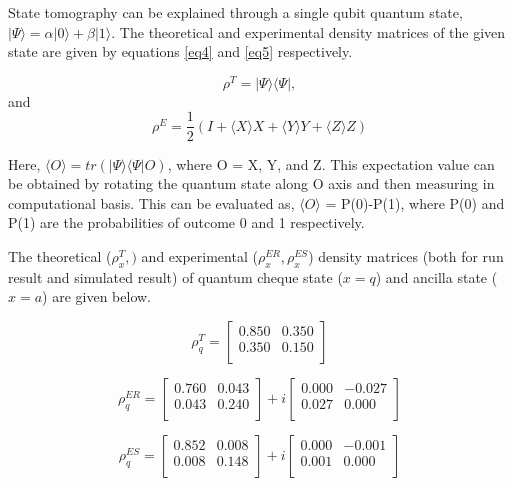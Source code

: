 \documentclass[aps,pra,twocolumn,groupedaddress,showpacs,showkeys]{revtex4-1}
\begin{document}
State tomography can be explained through a single qubit quantum state, $|\Psi\rangle = \alpha|0\rangle + \beta|1\rangle$. The theoretical and experimental density matrices of the given state are given by equations \ref{eq4} and \ref{eq5} respectively. 

\begin{equation}
\rho^{T}= |\Psi\rangle \langle\Psi|,     
\label{eq4}
\end{equation}
and 
\begin{equation}
\rho^{E}= \frac{1}{2} (I + \langle X\rangle X + \langle Y \rangle Y + \langle Z \rangle Z)
\label{eq5}
\end{equation}
 
Here, $\langle O \rangle = tr(|\Psi\rangle \langle \Psi|O)$, where O = X, Y, and Z. This expectation value can be obtained by rotating the quantum state along O axis and then measuring in computational basis. This can be evaluated as, $\langle O \rangle$ = P(0)-P(1), where P(0) and P(1) are the probabilities of outcome 0 and 1 respectively.  

The theoretical ($\rho^{T}_x,)$ and experimental ($\rho^{ER}_x, \rho^{ES}_x$) density matrices (both for run result and simulated result) of quantum cheque state ($x=q$) and ancilla state ($x=a$) are given below. 

\[
   \rho^{T}_{q}=
  \left[ {\begin{array}{cc}
   0.850 & 0.350 \\
   0.350 & 0.150 \\
  \end{array} } \right]
\]

\[
  \rho^{ER}_{q}=
  \left[ {\begin{array}{cc}
   0.760 & 0.043 \\
   0.043 & 0.240 \\
  \end{array} } \right]+ i\left[ {\begin{array}{cc}
   0.000 & -0.027 \\
   0.027 & 0.000 \\
  \end{array} } \right]
\]

\[
  \rho^{ES}_{q}=
  \left[ {\begin{array}{cc}
   0.852 & 0.008 \\
   0.008 & 0.148 \\
  \end{array} } \right]+ i\left[ {\begin{array}{cc}
   0.000 & -0.001 \\
   0.001 & 0.000 \\
  \end{array} } \right]
\]
\end{document}
